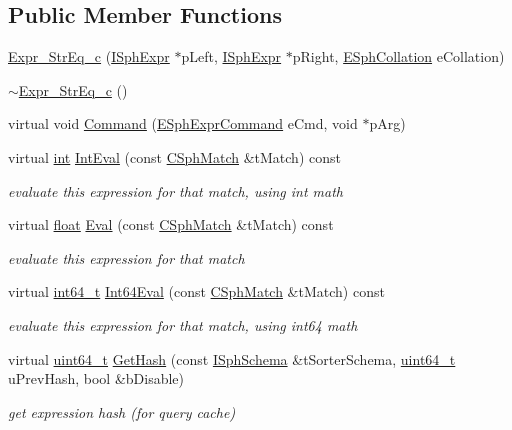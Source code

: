 \subsection*{Public Member Functions}
\begin{DoxyCompactItemize}
\item 
\hyperlink{structExpr__StrEq__c_a8ed96f9d803bec4e3f32a8c241790e2f}{Expr\-\_\-\-Str\-Eq\-\_\-c} (\hyperlink{structISphExpr}{I\-Sph\-Expr} $\ast$p\-Left, \hyperlink{structISphExpr}{I\-Sph\-Expr} $\ast$p\-Right, \hyperlink{sphinxexpr_8h_a78197b7b74319074237ecaf5d99cfbe5}{E\-Sph\-Collation} e\-Collation)
\item 
\hyperlink{structExpr__StrEq__c_aa0b50f4f67d02f2433deb8359745637e}{$\sim$\-Expr\-\_\-\-Str\-Eq\-\_\-c} ()
\item 
virtual void \hyperlink{structExpr__StrEq__c_a1e1f255f8b4cfdcba3c8e9c2351f283a}{Command} (\hyperlink{sphinxexpr_8h_a30be184fb07bd80c271360fc6094c818}{E\-Sph\-Expr\-Command} e\-Cmd, void $\ast$p\-Arg)
\item 
virtual \hyperlink{sphinxexpr_8cpp_a4a26e8f9cb8b736e0c4cbf4d16de985e}{int} \hyperlink{structExpr__StrEq__c_aa3ddc18df4e8fad374f80fa7f4688d5d}{Int\-Eval} (const \hyperlink{classCSphMatch}{C\-Sph\-Match} \&t\-Match) const 
\begin{DoxyCompactList}\small\item\em evaluate this expression for that match, using int math \end{DoxyCompactList}\item 
virtual \hyperlink{sphinxexpr_8cpp_a0e0d0739f7035f18f949c2db2c6759ec}{float} \hyperlink{structExpr__StrEq__c_a182f61733dcf0fb25e60801bc40f40bf}{Eval} (const \hyperlink{classCSphMatch}{C\-Sph\-Match} \&t\-Match) const 
\begin{DoxyCompactList}\small\item\em evaluate this expression for that match \end{DoxyCompactList}\item 
virtual \hyperlink{sphinxstd_8h_a996e72f71b11a5bb8b3b7b6936b1516d}{int64\-\_\-t} \hyperlink{structExpr__StrEq__c_a55ac8bd46c4f413ff39fd2ccf18bc420}{Int64\-Eval} (const \hyperlink{classCSphMatch}{C\-Sph\-Match} \&t\-Match) const 
\begin{DoxyCompactList}\small\item\em evaluate this expression for that match, using int64 math \end{DoxyCompactList}\item 
virtual \hyperlink{sphinxstd_8h_aaa5d1cd013383c889537491c3cfd9aad}{uint64\-\_\-t} \hyperlink{structExpr__StrEq__c_a45b2f0ac3d138faa2094b6ce39c0c00e}{Get\-Hash} (const \hyperlink{classISphSchema}{I\-Sph\-Schema} \&t\-Sorter\-Schema, \hyperlink{sphinxstd_8h_aaa5d1cd013383c889537491c3cfd9aad}{uint64\-\_\-t} u\-Prev\-Hash, bool \&b\-Disable)
\begin{DoxyCompactList}\small\item\em get expression hash (for query cache) \end{DoxyCompactList}\end{DoxyCompactItemize}
